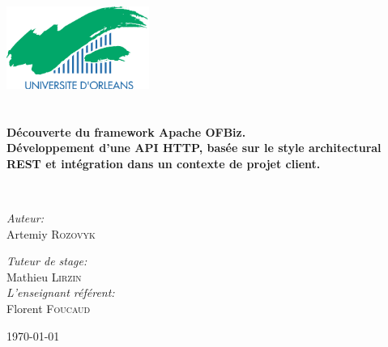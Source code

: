 \begin{titlepage}
\begin{center}

\includegraphics[width=0.35\textwidth]{./logo}~\\[1cm]


\textsc{\Large }\\[0.5cm]

\HRule \\[0.4cm]


{\huge \bfseries Découverte du framework Apache OFBiz.\\
	Développement d'une API HTTP, basée sur le style architectural REST et intégration dans un contexte de projet client. \\[0.4cm] }

\HRule \\[1.5cm]


\begin{minipage}{0.4\textwidth}
\begin{flushleft} \large
\emph{Auteur:}\\
Artemiy \textsc{Rozovyk}\\
\thispagestyle{empty}
\end{flushleft}
\end{minipage}
\begin{minipage}{0.4\textwidth}
\thispagestyle{empty}
\begin{flushright} \large
\emph{Tuteur de stage:} \\
Mathieu \textsc{Lirzin}\\
\emph{L'enseignant référent:} \\
Florent \textsc{Foucaud}
\end{flushright}
\end{minipage}

\vfill

{\large \today}

\end{center}
\end{titlepage}
